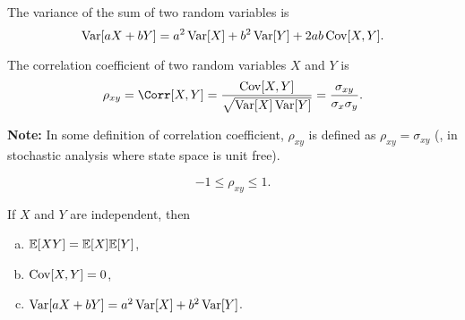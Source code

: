\begin{theorem}
    The variance of the sum of two random variables is
    \[\mathop{\mathrm{Var}}\nolimits[aX+bY]=a^2\mathop{\mathrm{Var}}\nolimits[X]+b^2\mathop{\mathrm{Var}}\nolimits[Y]+2ab\mathop{\mathrm{Cov}}\nolimits[X,Y].\]
\end{theorem}

\begin{definition}
    The correlation coefficient of two random variables $X$ and $Y$ is
    \[\rho_{xy}=\Corr[X,Y]=\frac{\Cov[X,Y]}{\sqrt{\Var[X]\Var[Y]}}=\frac{\sigma_{xy}}{\sigma_x\sigma_y}.\]
\end{definition}
\textbf{Note:} In some definition of correlation coefficient, $\rho_{xy}$ is defined as $\rho_{xy}=\sigma_{xy}$ (\eg, in stochastic analysis where state space is unit free).

\begin{theorem}
    \[-1\leq \rho_{xy}\leq 1.\]
\end{theorem}

\begin{theorem}
    If $X$ and $Y$ are independent, then
    \begin{enumerate}[(a)]
        \item $\E{XY}=\E{X}\E{Y}$,
        \item $\mathop{\mathrm{Cov}}\nolimits[X, Y]=0$,
        \item $\mathop{\mathrm{Var}}\nolimits[aX+bY]=a^2\mathop{\mathrm{Var}}\nolimits[X]+b^2\mathop{\mathrm{Var}}\nolimits[Y]$.
    \end{enumerate}
\end{theorem}



